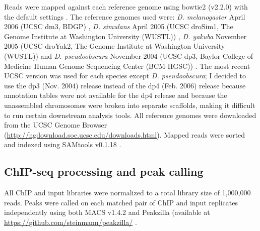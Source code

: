 Reads were mapped against each reference genome using bowtie2 (v2.2.0) with the default settings \citep{langmead_fast_2012}. The reference genomes used were: \emph{D. melanogaster} April 2006 (UCSC dm3, BDGP) \citep{adams_genome_2000, celniker_finishing_2002}, \emph{D. simulans} April 2005 (UCSC droSim1, The Genome Institute at Washington University (WUSTL)) \citep{clark_evolution_2007}, \emph{D. yakuba} November 2005 (UCSC droYak2, The Genome Institute at Washington University (WUSTL)) \citep{clark_evolution_2007} and \emph{D. pseudoobscura} November 2004 (UCSC dp3, Baylor College of Medicine Human Genome Sequencing Center (BCM-HGSC)) \citep{clark_evolution_2007, richards_comparative_2005}. The most recent UCSC version was used for each species except \emph{D. pseudoobscura}; I decided to use the dp3 (Nov. 2004) release instead of the dp4 (Feb. 2006) release because annotation tables were not available for the dp4 release and because the unassembled chromosomes were broken into separate scaffolds, making it difficult to run certain downstream analysis tools. All reference genomes were downloaded from the UCSC Genome Browser (\url{http://hgdownload.soe.ucsc.edu/downloads.html}). Mapped reads were sorted and indexed using SAMtools v0.1.18 \citep{li_sequence_2009}.

\subsection{ChIP-seq processing and peak calling}
All ChIP and input libraries were normalized to a total library size of 1,000,000 reads. Peaks were called on each matched pair of ChIP and input replicates independently using both MACS v1.4.2 and Peakzilla (available at \url{https://github.com/steinmann/peakzilla/} \citep{bardet_identification_2013, zhang_model-based_2008}.

